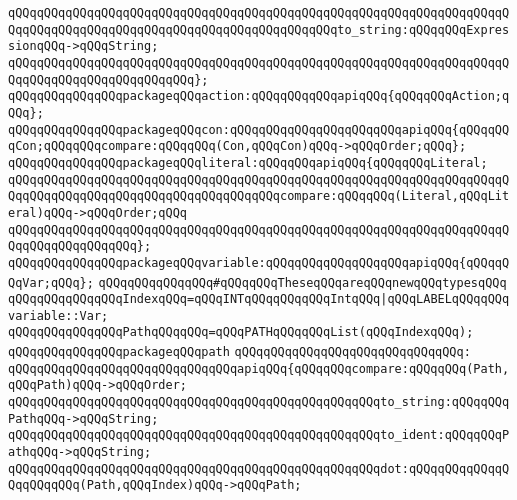 \verb|qQQqqQQqqQQqqQQqqQQqqQQqqQQqqQQqqQQqqQQqqQQqqQQqqQQqqQQqqQQqqQQqqQQqqQQqqQQqqQQqqQQqqQQqqQQqqQQqqQQqqQQqqQQqqQQqqQQqto_string:qQQqqQQqExpressionqQQq->qQQqString;|\newline
\verb|qQQqqQQqqQQqqQQqqQQqqQQqqQQqqQQqqQQqqQQqqQQqqQQqqQQqqQQqqQQqqQQqqQQqqQQqqQQqqQQqqQQqqQQqqQQqqQQq};|\newline
\newline
\verb|qQQqqQQqqQQqqQQqpackageqQQqaction:qQQqqQQqqQQqapiqQQq{qQQqqQQqAction;qQQq};|\newline
\verb|qQQqqQQqqQQqqQQqpackageqQQqcon:qQQqqQQqqQQqqQQqqQQqqQQqapiqQQq{qQQqqQQqCon;qQQqqQQqcompare:qQQqqQQq(Con,qQQqCon)qQQq->qQQqOrder;qQQq};|\newline
\verb|qQQqqQQqqQQqqQQqpackageqQQqliteral:qQQqqQQqapiqQQq{qQQqqQQqLiteral;|\newline
\verb|qQQqqQQqqQQqqQQqqQQqqQQqqQQqqQQqqQQqqQQqqQQqqQQqqQQqqQQqqQQqqQQqqQQqqQQqqQQqqQQqqQQqqQQqqQQqqQQqqQQqqQQqqQQqcompare:qQQqqQQq(Literal,qQQqLiteral)qQQq->qQQqOrder;qQQq|\newline
\verb|qQQqqQQqqQQqqQQqqQQqqQQqqQQqqQQqqQQqqQQqqQQqqQQqqQQqqQQqqQQqqQQqqQQqqQQqqQQqqQQqqQQqqQQq};|\newline
\newline
\verb|qQQqqQQqqQQqqQQqpackageqQQqvariable:qQQqqQQqqQQqqQQqqQQqapiqQQq{qQQqqQQqVar;qQQq};|\newline
\newline
\verb|qQQqqQQqqQQqqQQq#qQQqqQQqTheseqQQqareqQQqnewqQQqtypesqQQq|\newline
\verb|qQQqqQQqqQQqqQQqIndexqQQq=qQQqINTqQQqqQQqqQQqIntqQQq|\verb#|qQQqLABELqQQqqQQqvariable::Var;#\newline
\verb|qQQqqQQqqQQqqQQqPathqQQqqQQq=qQQqPATHqQQqqQQqList(qQQqIndexqQQq);|\newline
\newline
\verb|qQQqqQQqqQQqqQQqpackageqQQqpath|\newline
\verb|qQQqqQQqqQQqqQQqqQQqqQQqqQQqqQQq:|\newline
\verb|qQQqqQQqqQQqqQQqqQQqqQQqqQQqqQQqapiqQQq{qQQqqQQqcompare:qQQqqQQq(Path,qQQqPath)qQQq->qQQqOrder;|\newline
\verb|qQQqqQQqqQQqqQQqqQQqqQQqqQQqqQQqqQQqqQQqqQQqqQQqqQQqto_string:qQQqqQQqPathqQQq->qQQqString;|\newline
\verb|qQQqqQQqqQQqqQQqqQQqqQQqqQQqqQQqqQQqqQQqqQQqqQQqqQQqto_ident:qQQqqQQqPathqQQq->qQQqString;|\newline
\verb|qQQqqQQqqQQqqQQqqQQqqQQqqQQqqQQqqQQqqQQqqQQqqQQqqQQqdot:qQQqqQQqqQQqqQQqqQQqqQQq(Path,qQQqIndex)qQQq->qQQqPath;|\newline
